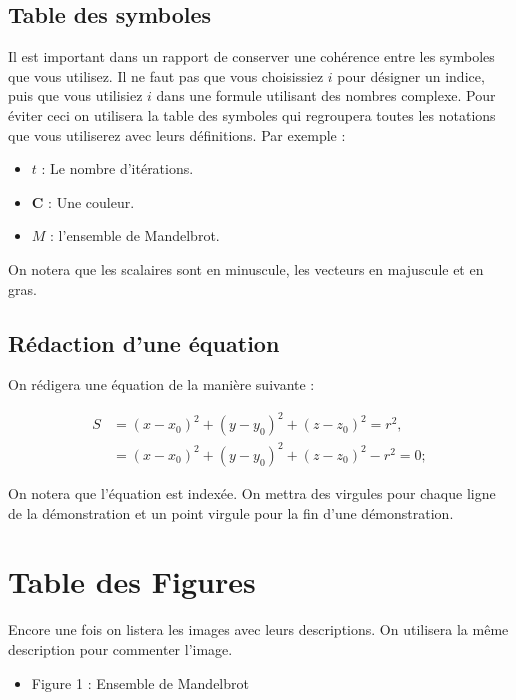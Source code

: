 \documentclass[french,12pt]{article}
\begin{document}
\subsection{Table des symboles}
Il est important dans un rapport de conserver une cohérence entre les symboles que vous utilisez. Il ne faut pas que vous choisissiez $i$ pour désigner un indice, puis que vous utilisiez $i$ dans une formule utilisant des nombres complexe. Pour éviter ceci on utilisera la table des symboles qui regroupera toutes les notations que vous utiliserez avec leurs définitions. Par exemple :

\begin{itemize}
	\item $t$ : Le nombre d'itérations.
	\item $\mathbf{C}$ : Une couleur.
	\item $M$ : l'ensemble de Mandelbrot.
\end{itemize}

On notera que les scalaires sont en minuscule, les vecteurs en majuscule et en gras.

\subsection{Rédaction d'une équation}
On rédigera une équation de la manière suivante : 

\begin{equation} \label{eq1}
\begin{split}
S & = (x-x_0)^2+(y-y_0)^2+(z-z_0)^2 = r^2, \\
 & = (x-x_0)^2+(y-y_0)^2+(z-z_0)^2 -r^2 = 0;
\end{split}
\end{equation}

On notera que l'équation est indexée. On mettra des virgules pour chaque ligne de la démonstration et un point virgule pour la fin d'une démonstration.

\section{Table des Figures}
Encore une fois on listera les images avec leurs descriptions. On utilisera la même description pour commenter l'image.
\begin{itemize}
	\item Figure 1 : Ensemble de Mandelbrot
\end{itemize}
\end{document}
